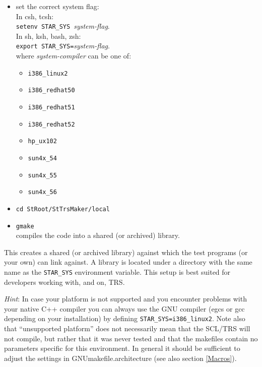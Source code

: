 \documentclass[twoside]{article}
\newcommand{\name}[1]{\textsf{#1}}%
\newcommand{\comp}[1]{\texttt{#1}}%
\newcommand{\args}[1]{\textit{#1}}%
\begin{document}
\begin{itemize}
  \item set the correct system flag:\\
    In \name{csh, tcsh}:\\
    \comp{setenv STAR\_SYS}\ \args{system-flag}.\\
    In \name{sh, ksh, bash, zsh}:\\
    \comp{export STAR\_SYS=}\args{system-flag}.\\
    where \args{system-compiler} can be one of:
    \begin{itemize}
    \item \comp{i386\_linux2}
    \item \comp{i386\_redhat50}
    \item \comp{i386\_redhat51}
    \item \comp{i386\_redhat52}
    \item \comp{hp\_ux102}
    \item \comp{sun4x\_54}
    \item \comp{sun4x\_55}
    \item \comp{sun4x\_56}
    \end{itemize}
  \item \comp{cd StRoot/StTrsMaker/local}
  \item \comp{gmake} \\ compiles the code into a shared (or archived) library.
\end{itemize}
This creates a shared (or archived library) against which the test
programs (or your own) can link against.  A library is located 
under a directory with the same name as the
\comp{STAR\_SYS} environment variable. This setup is best suited for
developers working with, and on, \name{TRS}.

\textit{Hint}:  
In case your platform is not supported and you  
encounter problems with your native C++ compiler you can always use
the GNU  compiler (\name{egcs} or \name{gcc} depending on your
installation)   by 
defining \comp{STAR\_SYS=i386\_linux2}.  Note also
that ``unsupported platform'' does not necessarily mean that 
the SCL/TRS will not
compile, but rather that it was never tested and that the
makefiles contain no parameters specific for this environment.  In
general it should be sufficient to adjust the settings in
\name{GNUmakefile.architecture} (see also section \ref{Macros}).
\end{document}
